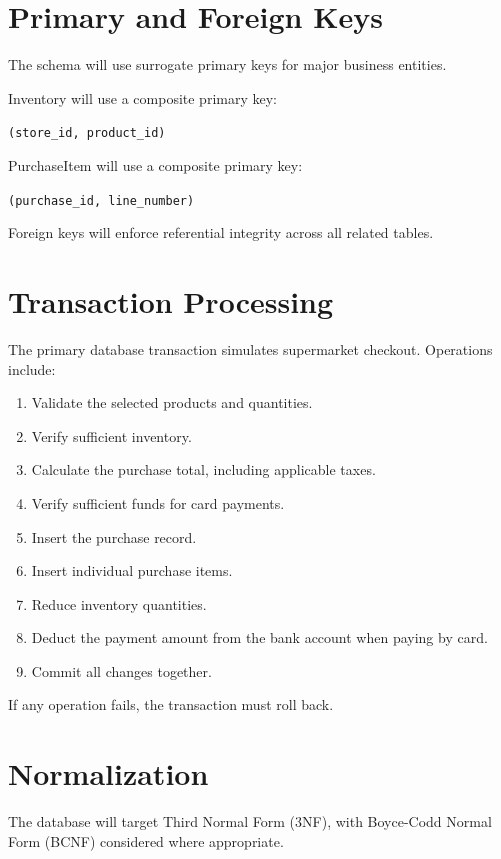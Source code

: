 \documentclass[11pt, a4paper]{article}
\begin{document}
\section{Primary and Foreign Keys}
The schema will use surrogate primary keys for major business entities.

Inventory will use a composite primary key:
\begin{center}
    \texttt{(store\_id, product\_id)}
\end{center}

PurchaseItem will use a composite primary key:
\begin{center}
    \texttt{(purchase\_id, line\_number)}
\end{center}

Foreign keys will enforce referential integrity across all related tables.

\section{Transaction Processing}
The primary database transaction simulates supermarket checkout. Operations include:
\begin{enumerate}[leftmargin=2.5em, itemsep=2pt]
    \item Validate the selected products and quantities.
    \item Verify sufficient inventory.
    \item Calculate the purchase total, including applicable taxes.
    \item Verify sufficient funds for card payments.
    \item Insert the purchase record.
    \item Insert individual purchase items.
    \item Reduce inventory quantities.
    \item Deduct the payment amount from the bank account when paying by card.
    \item Commit all changes together.
\end{enumerate}

If any operation fails, the transaction must roll back.

\section{Normalization}
The database will target Third Normal Form (3NF), with Boyce-Codd Normal Form (BCNF) considered where appropriate.
\end{document}
